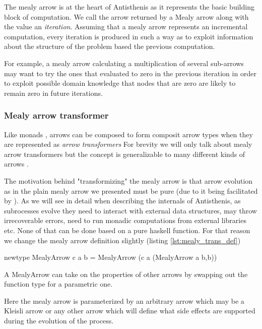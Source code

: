 The mealy arrow is at the heart of Antisthenis as it represents the
basic building block of computation. We call the arrow returned by a
Mealy arrow along with the value an \emph{iteration}. Assuming that a
mealy arrow represents an incremental computation, every iteration is
produced in such a way as to exploit information about the structure
of the problem based the previous computation.

For example, a mealy arrow calculating a multiplication of several
sub-arrows may want to try the ones that evaluated to zero in the
previous iteration in order to exploit possible domain knowledge that
nodes that are zero are likely to remain zero in future iterations.

\subsubsection{Mealy arrow transformer}

Like monads \cite{liangMonadTransformersModular1995} , arrows can be
composed to form composit arrow types when they are represented as
\emph{arrow transformers} For brevity we will only talk about mealy
arrow transformers but the concept is generalizable to many different
kinds of arrows \cite{keidelSoundReusableComponents2019a}.

The motivation behind "transformizing" the mealy arrow is that arrow
evolution as in the plain mealy arrow we presented must be pure (due
to it being facilitated by \hask{->}). As we will see in detail when
describing the internals of Antisthenis, as subrocesses evolve they
need to interact with external data structures, may throw
irrecoverable errors, need to run monadic computations from external
libraries etc. None of that can be done based on a pure haskell
function. For that reason we change the mealy arrow definition
slightly (listing \ref{lst:mealy_trans_def})

\begin{code}
\begin{haskellcode}
newtype MealyArrow c a b =
  MealyArrow (c a (MealyArrow a b,b))
\end{haskellcode}
  \caption{\label{lst:mealy_trans_def}A MealyArrow can take on the
    properties of other arrows by swapping out the function \hask{->}
    type for a parametric one.}
\end{code}

Here the mealy arrow is parameterized by an arbitrary arrow 
which may be a Kleisli arrow or any other arrow which will define what
side effects are supported during the evolution of the process.

